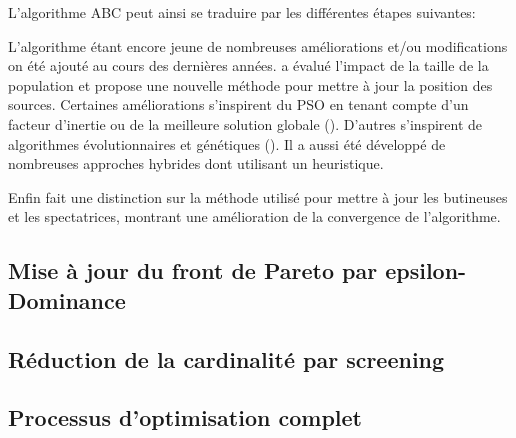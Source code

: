 L’algorithme ABC peut ainsi se traduire par les différentes étapes suivantes:

L’algorithme étant encore jeune de nombreuses améliorations et/ou modifications on été ajouté au cours des dernières années.
\cite{Aderhold2010283} a évalué l’impact de la taille de la population et propose une nouvelle méthode
pour mettre à jour la position des sources. Certaines améliorations s’inspirent du PSO en tenant compte d’un facteur
d’inertie ou de la meilleure solution globale (\cite{Lei2010,Zou20109}).
D’autres s’inspirent de algorithmes évolutionnaires et génétiques (\cite{Bi2011174,Zhao2010558}). Il a aussi été développé
de nombreuses approches hybrides dont \cite{Pulikanti2009196} utilisant un heuristique.

Enfin \cite{Karaboga2014227} fait une distinction sur la méthode utilisé pour mettre à jour les butineuses et les spectatrices, montrant
une amélioration de la convergence de l’algorithme.







\subsection{Mise à jour du front de Pareto par epsilon-Dominance} %
\label{sub:mise_a_jour_du_front_de_pareto_par_epsilon_dominance}


\subsection{Réduction de la cardinalité par screening} %
\label{sub:reduction_de_la_cardinalite_par_screening}


\subsection{Processus d’optimisation complet} %
\label{sub:processus_d_optimisation_complet}

